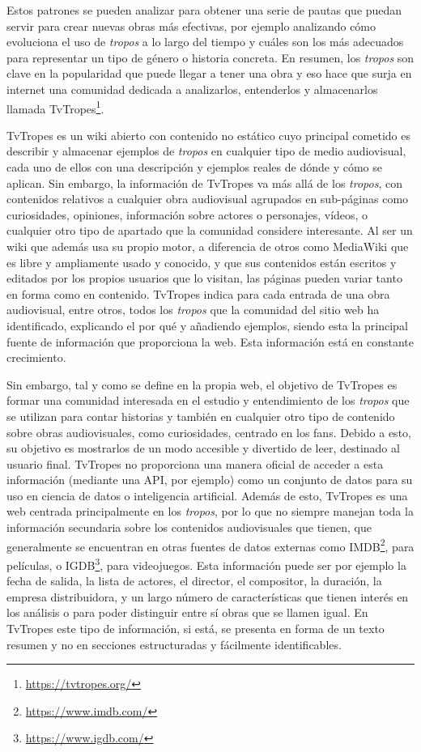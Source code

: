 Estos patrones se pueden analizar para obtener una serie de pautas que puedan
servir para crear nuevas obras más efectivas, por ejemplo analizando cómo
evoluciona el uso de \textit{tropos} a lo largo del tiempo y cuáles son los más
adecuados para representar un tipo de género o historia concreta. En resumen,
los \textit{tropos} son clave en la popularidad que puede llegar a tener una
obra y eso hace que surja en internet una comunidad dedicada a analizarlos,
entenderlos y almacenarlos llamada
TvTropes\footnote{\url{https://tvtropes.org/}}. 

TvTropes es un wiki abierto con contenido no estático cuyo principal cometido es
describir y almacenar ejemplos de \textit{tropos} en cualquier tipo de medio
audiovisual, cada uno de ellos con una descripción y ejemplos reales de dónde y
cómo se aplican. Sin embargo, la información de TvTropes va más allá de los
\textit{tropos}, con contenidos relativos a cualquier obra audiovisual agrupados
en sub-páginas como curiosidades, opiniones, información sobre actores o
personajes, vídeos, o cualquier otro tipo de apartado que la comunidad considere
interesante. Al ser un wiki que además usa su propio motor, a diferencia de
otros como MediaWiki que es libre y ampliamente usado y conocido, y que sus
contenidos están escritos y editados por los propios usuarios que lo visitan,
las páginas pueden variar tanto en forma como en contenido. TvTropes indica para
cada entrada de una obra audiovisual, entre otros, todos los \textit{tropos} que
la comunidad del sitio web ha identificado, explicando el por qué y añadiendo
ejemplos, siendo esta la principal fuente de información que proporciona la web.
Esta información está en constante crecimiento.

Sin embargo, tal y como se define en la propia web, el objetivo de TvTropes es
formar una comunidad interesada en el estudio y entendimiento de los
\textit{tropos} que se utilizan para contar historias y también en cualquier
otro tipo de contenido sobre obras audiovisuales, como curiosidades, centrado en
los fans. Debido a esto, su objetivo es mostrarlos de un modo accesible y
divertido de leer, destinado al usuario final. TvTropes no proporciona una
manera oficial de acceder a esta información (mediante una API, por ejemplo) como
un conjunto de datos para su uso en ciencia de datos o inteligencia artificial.
Además de esto, TvTropes es una web centrada principalmente en los
\textit{tropos}, por lo que no siempre manejan toda la información secundaria
sobre los contenidos audiovisuales que tienen, que generalmente se encuentran en
otras fuentes de datos externas como IMDB\footnote{\url{https://www.imdb.com/}},
para películas, o IGDB\footnote{\url{https://www.igdb.com/}}, para videojuegos.
Esta información puede ser por ejemplo la fecha de salida, la lista de actores,
el director, el compositor, la duración, la empresa distribuidora, y un largo
número de características que tienen interés en los análisis o para poder
distinguir entre sí obras que se llamen igual. En TvTropes este tipo de
información, si está, se presenta en forma de un texto resumen y no en secciones
estructuradas y fácilmente identificables.

